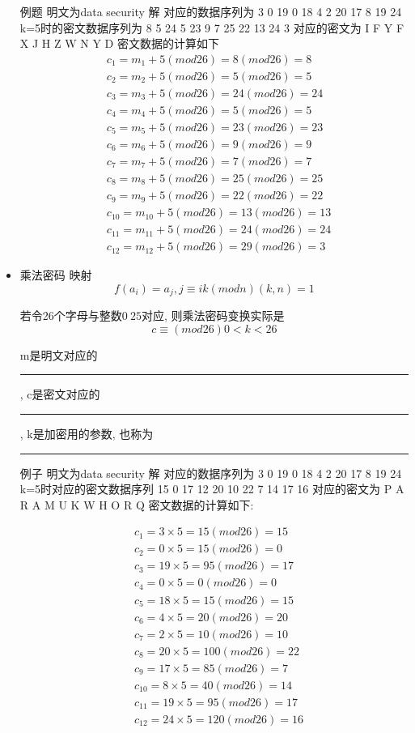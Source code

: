 \documentclass[UTF8]{ctexart}
\newcommand\hl{\bgroup\markoverwith
  {\textcolor{yellow}{\rule[-.5ex]{2pt}{2.5ex}}}\ULon}
\begin{document}
\begin{itemize}
        例题 明文为data security
        解 对应的数据序列为 3 0 19 0 18 4 2 20 17 8 19 24
        k=5时的密文数据序列为 8 5 24 5 23 9 7 25 22 13 24 3
        对应的密文为          I F Y F X J H Z W N Y D
        密文数据的计算如下
        $$
        \begin{aligned}
            &c_1=m_1+5(mod 26)=8(mod 26)=8\\
            &c_2=m_2+5(mod 26)=5(mod 26)=5\\
            &c_3=m_3+5(mod 26)=24(mod 26)=24\\
            &c_4=m_4+5(mod 26)=5(mod 26)=5\\
            &c_5=m_5+5(mod 26)=23(mod 26)=23\\
            &c_6=m_6+5(mod 26)=9(mod 26)=9\\
            &c_7=m_7+5(mod 26)=7(mod 26)=7\\
            &c_8=m_8+5(mod 26)=25(mod 26)=25\\
            &c_9=m_9+5(mod 26)=22(mod 26)=22\\
            &c_{10}=m_{10}+5(mod 26)=13(mod 26)=13\\
            &c_{11}=m_{11}+5(mod 26)=24(mod 26)=24\\
            &c_{12}=m_{12}+5(mod 26)=29(mod 26)=3
        \end{aligned}
        $$

        \item 乘法密码
        映射
        $$f(a_i)=a_j, j\equiv ik(mod n) (k, n)=1$$

        若令26个字母与整数$0~25$对应, 则乘法密码变换实际是
        $$c\equiv (mod 26) 0<k<26$$

        m是明文对应的\hl{明文数据}, c是密文对应的\hl{密文数据}, k是加密用的参数, 也称为\hl{密钥}

        例子 明文为data security
        解 对应的数据序列为 3 0 19 0 18 4 2 20 17 8 19 24
        k=5时对应的密文数据序列 15 0 17 12 20 10 22 7 14 17 16
        对应的密文为 P A R A M U K W H O R Q
        密文数据的计算如下:

        $$
        \begin{aligned}
            &c_1=3\times 5=15(mod 26)=15\\
            &c_2=0\times 5=15(mod 26)=0\\
            &c_3=19\times 5=95(mod 26)=17\\
            &c_4=0\times 5=0(mod 26)=0\\
            &c_5=18\times 5=15(mod 26)=15\\
            &c_6=4\times 5=20(mod 26)=20\\
            &c_7=2\times 5=10(mod 26)=10\\
            &c_8=20\times 5=100(mod 26)=22\\
            &c_9=17\times 5=85(mod 26)=7\\
            &c_10=8\times 5=40(mod 26)=14\\
            &c_11=19\times 5=95(mod 26)=17\\
            &c_12=24\times 5=120(mod 26)=16
        \end{aligned}
        $$


\end{itemize}
\end{document}
